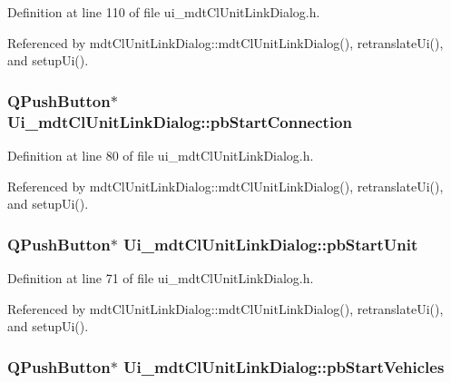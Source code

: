 Definition at line 110 of file ui\-\_\-mdt\-Cl\-Unit\-Link\-Dialog.\-h.



Referenced by mdt\-Cl\-Unit\-Link\-Dialog\-::mdt\-Cl\-Unit\-Link\-Dialog(), retranslate\-Ui(), and setup\-Ui().

\hypertarget{class_ui__mdt_cl_unit_link_dialog_ad3c8e8763cd7e3385df04239a7b2361c}{
\subsubsection[{pb\-Start\-Connection}]{\setlength{\rightskip}{0pt plus 5cm}Q\-Push\-Button$\ast$ Ui\-\_\-mdt\-Cl\-Unit\-Link\-Dialog\-::pb\-Start\-Connection}}\label{class_ui__mdt_cl_unit_link_dialog_ad3c8e8763cd7e3385df04239a7b2361c}


Definition at line 80 of file ui\-\_\-mdt\-Cl\-Unit\-Link\-Dialog.\-h.



Referenced by mdt\-Cl\-Unit\-Link\-Dialog\-::mdt\-Cl\-Unit\-Link\-Dialog(), retranslate\-Ui(), and setup\-Ui().

\hypertarget{class_ui__mdt_cl_unit_link_dialog_acd5fed0c4505ea55bbd9d1702aeaa772}{
\subsubsection[{pb\-Start\-Unit}]{\setlength{\rightskip}{0pt plus 5cm}Q\-Push\-Button$\ast$ Ui\-\_\-mdt\-Cl\-Unit\-Link\-Dialog\-::pb\-Start\-Unit}}\label{class_ui__mdt_cl_unit_link_dialog_acd5fed0c4505ea55bbd9d1702aeaa772}


Definition at line 71 of file ui\-\_\-mdt\-Cl\-Unit\-Link\-Dialog.\-h.



Referenced by mdt\-Cl\-Unit\-Link\-Dialog\-::mdt\-Cl\-Unit\-Link\-Dialog(), retranslate\-Ui(), and setup\-Ui().

\hypertarget{class_ui__mdt_cl_unit_link_dialog_a76e41cf9a2d85ea9ad0e15d3f0f4ed91}{
\subsubsection[{pb\-Start\-Vehicles}]{\setlength{\rightskip}{0pt plus 5cm}Q\-Push\-Button$\ast$ Ui\-\_\-mdt\-Cl\-Unit\-Link\-Dialog\-::pb\-Start\-Vehicles}}\label{class_ui__mdt_cl_unit_link_dialog_a76e41cf9a2d85ea9ad0e15d3f0f4ed91}


